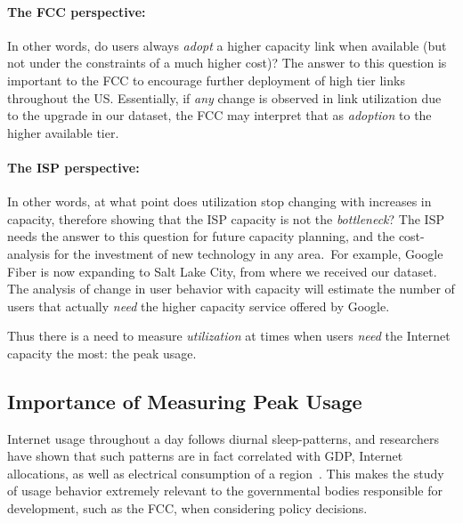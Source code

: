 \paragraph{The FCC perspective: } In other words, do users always \emph{adopt} a higher capacity
link when available (but not under the constraints of a much higher cost)? The answer to this
question is important to the FCC to encourage further deployment of high tier links throughout
the US. Essentially, if \emph{any} change is observed in link utilization due to the upgrade in our dataset,
the FCC may interpret that as \emph{adoption} to the higher available tier.

\paragraph{The ISP perspective: } In other words, at what point does utilization stop changing
with increases in capacity, therefore showing that the ISP capacity is not the \emph{bottleneck}? 
The ISP needs the answer to this question for future capacity planning, and the cost-analysis
for the investment of new technology in any area.\
For example, Google Fiber is now expanding to Salt Lake City, from where we received our dataset.
The analysis of change in user behavior with capacity will estimate the number of users that
actually \emph{need} the higher capacity service offered by Google.

Thus there is a need to measure \emph{utilization} at times when users \emph{need} the Internet
capacity the most: the peak usage.

\subsection{Importance of Measuring Peak Usage}

Internet usage throughout a day follows diurnal sleep-patterns, and researchers
have shown that such patterns are in fact correlated with GDP, Internet allocations,
as well as electrical consumption of a region~\cite{ant-diurnal-web}. This makes
the study of usage behavior extremely relevant to the governmental bodies responsible
for development, such as the FCC, when considering policy decisions. 

